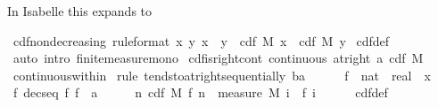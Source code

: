 \documentclass[leqno]{article}
\theoremstyle{definition}
\begin{document}
In Isabelle this expands to

\medskip

\begin{isabellebody}
\isamarkupfalse%
\ cdf{\isacharunderscore}nondecreasing\ {\isacharbrackleft}rule{\isacharunderscore}format{\isacharbrackright}{\isacharcolon}\ {\isachardoublequoteopen}{\isacharparenleft}{\isasymforall}x\ y{\isachardot}\ x\ {\isasymle}\ y\ {\isasymlongrightarrow}\ cdf\ M\ x\ {\isasymle}\ cdf\ M\ y{\isacharparenright}{\isachardoublequoteclose}\isanewline
{}\isamarkupfalse%
\ cdf{\isacharunderscore}def\ \isamarkupfalse%
\ {\isacharparenleft}auto\ intro{\isacharbang}{\isacharcolon}\ finite{\isacharunderscore}measure{\isacharunderscore}mono{\isacharparenright}%
\isanewline\isanewline%
\isamarkupfalse%
\ cdf{\isacharunderscore}is{\isacharunderscore}right{\isacharunderscore}cont{\isacharcolon}\ {\isachardoublequoteopen}continuous\ {\isacharparenleft}at{\isacharunderscore}right\ a{\isacharparenright}\ {\isacharparenleft}cdf\ M{\isacharparenright}{\isachardoublequoteclose}\isanewline
{}\isamarkupfalse%
\ continuous{\isacharunderscore}within\isanewline
{}\isamarkupfalse%
\ {\isacharparenleft}rule\ tendsto{\isacharunderscore}at{\isacharunderscore}right{\isacharunderscore}sequentially{\isacharbrackleft}\ b{\isacharequal}{\isachardoublequoteopen}a\ {\isacharplus}\ {}{\isachardoublequoteclose}{\isacharbrackright}{\isacharparenright}\isanewline
\ \ \isamarkupfalse%
\ f\ {\isacharcolon}{\isacharcolon}\ {\isachardoublequoteopen}nat\ {\isasymRightarrow}\ real{\isachardoublequoteclose}\ \ x\ \isamarkupfalse%
\ f{\isacharcolon}\ {\isachardoublequoteopen}decseq\ f{\isachardoublequoteclose}\ {\isachardoublequoteopen}f\ {\isacharminus}{\isacharminus}{\isacharminus}{\isacharminus}{\isachargreater}\ a{\isachardoublequoteclose}\isanewline
\ \ \isamarkupfalse%
\ \isamarkupfalse%
\ {\isachardoublequoteopen}{\isacharparenleft}{\isasymlambda}n{\isachardot}\ cdf\ M\ {\isacharparenleft}f\ n{\isacharparenright}{\isacharparenright}\ {\isacharminus}{\isacharminus}{\isacharminus}{\isacharminus}{\isachargreater}\ measure\ M\ {\isacharparenleft}{\isasymInter}i{\isachardot}\ {\isacharbraceleft}{\isachardot}{\isachardot}\ f\ i{\isacharbraceright}{\isacharparenright}{\isachardoublequoteclose}\isanewline
\ \ \ \ \isamarkupfalse%
\ cdf{\isacharunderscore}def\ \isanewline
\ \ \ \ \isamarkupfalse%

\end{isabellebody}
\end{document}
